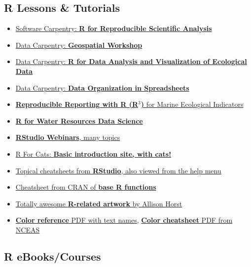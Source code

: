 \documentclass[
]{book}
\providecommand{\tightlist}{%
  \setlength{\itemsep}{0pt}\setlength{\parskip}{0pt}}
\begin{document}
\subsection{R Lessons \& Tutorials}\label{r-lessons-tutorials}

\begin{itemize}
\tightlist
\item
  \href{http://data-lessons.github.io/gapminder-R/}{Software Carpentry: \textbf{R for Reproducible Scientific Analysis}}
\item
  \href{https://datacarpentry.org/geospatial-workshop/}{Data Carpentry: \textbf{Geospatial Workshop}}
\item
  \href{http://www.datacarpentry.org/R-ecology-lesson/}{Data Carpentry: \textbf{R for Data Analysis and Visualization of Ecological Data}}
\item
  \href{http://www.datacarpentry.org/spreadsheet-ecology-lesson/}{Data Carpentry: \textbf{Data Organization in Spreadsheets}}
\item
  \href{https://noaa-iea.github.io/r3-train/}{\textbf{Reproducible Reporting with R (R\(^3\))} for Marine Ecological Indicators}
\item
  \href{https://www.r4wrds.com/}{\textbf{R for Water Resources Data Science}}
\item
  \href{https://www.rstudio.com/resources/webinars/}{\textbf{RStudio Webinars}, many topics}
\item
  \href{http://rforcats.net/}{R For Cats: \textbf{Basic introduction site, with cats!}}
\item
  \href{http://www.rstudio.com/resources/cheatsheets/}{Topical cheatsheets from \textbf{RStudio}, also viewed from the help menu}
\item
  \href{http://cran.r-project.org/doc/contrib/Short-refcard.pdf}{Cheatsheet from CRAN of \textbf{base R functions}}
\item
  \href{https://github.com/allisonhorst/stats-illustrations}{Totally awesome \textbf{R-related artwork} by Allison Horst}
\item
  \href{http://www.stat.columbia.edu/~tzheng/files/Rcolor.pdf}{\textbf{Color reference} PDF with text names}, \href{https://www.nceas.ucsb.edu/sites/default/files/2020-04/colorPaletteCheatsheet.pdf}{\textbf{Color cheatsheet} PDF from NCEAS}
\end{itemize}

\subsection{R eBooks/Courses}\label{r-ebookscourses}
\end{document}
